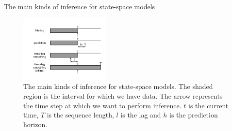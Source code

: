 \documentclass[10pt,mathserif]{beamer}
\begin{document}
\begin{frame}{The main kinds of inference for state-space models}
    \begin{figure}[h]
    \centering
    \includegraphics[width=0.4\textwidth]{dbn-inference-problems}
    \caption{The main kinds of inference for state-space models. The shaded region is the interval for which we have data. The arrow represents the time step at which we want to perform inference. $t$ is the current time, $T$ is the sequence length, $l$ is the lag and $h$ is the prediction horizon.}
    \end{figure}    
\end{frame}

    
    
    
    
\end{document}
